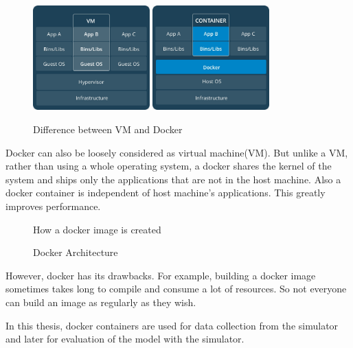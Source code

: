 \begin{figure}[!ht]
    \centering
    {\includegraphics[width=0.4\textwidth]{figures/inkscape/VM.jpeg}}
    \quad
    {\includegraphics[width=0.4\textwidth ]{figures/inkscape/dockerarchi.jpeg}}
    \caption{Difference between VM and Docker}
    \label{fig:vmvsdocker}

\end{figure}

Docker can also be loosely considered as virtual machine(VM). But unlike a VM, rather than
using a whole operating system, a docker shares the kernel of the system and ships only
the applications that are not in the host machine. Also a docker container is independent
of host machine's applications. This greatly improves performance.

\begin{figure}[!ht]
    \centering
    \def\svgwidth{0.7\textwidth}
    
    \caption{How a docker image is created}
    \label{fig:dockerimage}
\end{figure}
\begin{figure}[!ht]
    \centering
    \def\svgwidth{0.9\textwidth}
    
    \caption{Docker Architecture}
    \label{fig:dockerarchitecure}
\end{figure}

However, docker has its drawbacks. For example, building a docker image sometimes takes
long to compile and consume a lot of resources. So not everyone can build an image as
regularly as they wish.

In this thesis, docker containers are used for data collection from the simulator and later
for evaluation of the model with the simulator.

